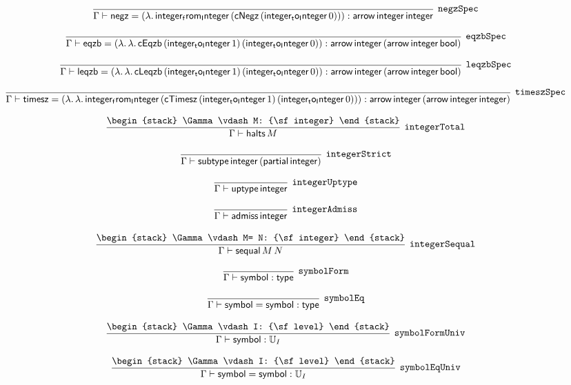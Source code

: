 \[
\infer[{\tt negzSpec}]{\Gamma \vdash {\sf negz}= (\lambda .\,{\sf integer_from_Integer}\,({\sf cNegz}\,({\sf integer_to_Integer}\,0))): {\sf arrow}\,{\sf integer}\,{\sf integer}}{}
\]

\[
\infer[{\tt eqzbSpec}]{\Gamma \vdash {\sf eqzb}= (\lambda .\,\lambda .\,{\sf cEqzb}\,({\sf integer_to_Integer}\,1)\,({\sf integer_to_Integer}\,0)): {\sf arrow}\,{\sf integer}\,({\sf arrow}\,{\sf integer}\,{\sf bool})}{}
\]

\[
\infer[{\tt leqzbSpec}]{\Gamma \vdash {\sf leqzb}= (\lambda .\,\lambda .\,{\sf cLeqzb}\,({\sf integer_to_Integer}\,1)\,({\sf integer_to_Integer}\,0)): {\sf arrow}\,{\sf integer}\,({\sf arrow}\,{\sf integer}\,{\sf bool})}{}
\]

\[
\infer[{\tt timeszSpec}]{\Gamma \vdash {\sf timesz}= (\lambda .\,\lambda .\,{\sf integer_from_Integer}\,({\sf cTimesz}\,({\sf integer_to_Integer}\,1)\,({\sf integer_to_Integer}\,0))): {\sf arrow}\,{\sf integer}\,({\sf arrow}\,{\sf integer}\,{\sf integer})}{}
\]

\[
\infer[{\tt integerTotal}]{\Gamma \vdash {\sf halts}\,M}{
\begin{stack}
\Gamma \vdash M: {\sf integer}
\end{stack}}
\]

\[
\infer[{\tt integerStrict}]{\Gamma \vdash {\sf subtype}\,{\sf integer}\,({\sf partial}\,{\sf integer})}{}
\]

\[
\infer[{\tt integerUptype}]{\Gamma \vdash {\sf uptype}\,{\sf integer}}{}
\]

\[
\infer[{\tt integerAdmiss}]{\Gamma \vdash {\sf admiss}\,{\sf integer}}{}
\]

\[
\infer[{\tt integerSequal}]{\Gamma \vdash {\sf sequal}\,M\,N}{
\begin{stack}
\Gamma \vdash M= N: {\sf integer}
\end{stack}}
\]

\[
\infer[{\tt symbolForm}]{\Gamma \vdash {\sf symbol}: {\sf type}}{}
\]

\[
\infer[{\tt symbolEq}]{\Gamma \vdash {\sf symbol}= {\sf symbol}: {\sf type}}{}
\]

\[
\infer[{\tt symbolFormUniv}]{\Gamma \vdash {\sf symbol}: {\Bbb U}_{I}}{
\begin{stack}
\Gamma \vdash I: {\sf level}
\end{stack}}
\]

\[
\infer[{\tt symbolEqUniv}]{\Gamma \vdash {\sf symbol}= {\sf symbol}: {\Bbb U}_{I}}{
\begin{stack}
\Gamma \vdash I: {\sf level}
\end{stack}}
\]

